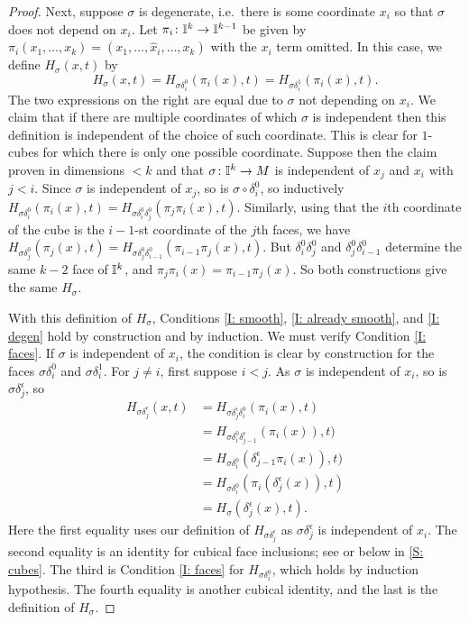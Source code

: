 \begin{proof}
	Next, suppose $\sigma$ is degenerate, i.e.\ there is some coordinate $x_i$ so that $\sigma$ does not depend on $x_i$.
	Let $\pi_i \colon \mathbb{I}^k\to\mathbb{I}^{k-1}$ be given by $\pi_i(x_1,\ldots, x_k) = (x_1,\ldots, \hat x_i, \ldots, x_k)$ with the $x_i$ term omitted.
	In this case, we define $H_\sigma(x,t)$ by
	\[H_\sigma(x,t) = H_{\sigma \delta_i^0}(\pi_i(x),t) = H_{\sigma \delta_i^1}(\pi_i(x),t).\]
	The two expressions on the right are equal due to $\sigma$ not depending on $x_i$.
	We claim that if there are multiple coordinates of which $\sigma$ is independent then this definition is independent of the choice of such coordinate.
	This is clear for $1$-cubes for which there is only one possible coordinate.
	Suppose then the claim proven in dimensions $<k$ and that $\sigma \colon \mathbb{I}^k \to M$ is independent of $x_j$ and $x_i$ with $j<i$.
	Since $\sigma$ is independent of $x_j$, so is $\sigma \circ \delta_i^0$, so inductively $H_{\sigma \delta_i^0}(\pi_i(x),t) = H_{\sigma \delta_i^0\delta_j^0}(\pi_j\pi_i(x),t)$.
	Similarly, using that the $i$th coordinate of the cube is the $i-1$-st coordinate of the $j$th faces, we have $H_{\sigma \delta_j^0}(\pi_j(x),t) = H_{\sigma \delta_j^0\delta_{i-1}^0}(\pi_{i-1}\pi_j(x),t)$.
	But $\delta_i^0\delta_j^0$ and $\delta_j^0\delta_{i-1}^0$ determine the same $k-2$ face of $\mathbb{I}^k$, and $\pi_j\pi_i(x) = \pi_{i-1}\pi_j(x)$.
	So both constructions give the same $H_\sigma$.

	With this definition of $H_\sigma$, Conditions \eqref{I: smooth}, \eqref{I: already smooth}, and \eqref{I: degen} hold by construction and by induction.
	We must verify Condition \eqref{I: faces}.
	If $\sigma$ is independent of $x_i$, the condition is clear by construction for the faces $\sigma\delta_i^0$ and $\sigma\delta_i^1$.
	For $j\neq i$, first suppose $i<j$.
	As $\sigma$ is independent of $x_i$, so is $\sigma\delta_j^\epsilon$, so
	\begin{align*}
		H_{\sigma\delta_j^\epsilon}(x,t)& = H_{\sigma\delta_j^\epsilon \delta_i^0}(\pi_i(x),t)\\
		& = H_{\sigma \delta_i^0\delta_{j-1}^\epsilon}(\pi_i(x)),t)\\
		& = H_{\sigma \delta_i^0}(\delta_{j-1}^\epsilon\pi_i(x)),t)\\
		& = H_{\sigma \delta_i^0}(\pi_i(\delta_j^\epsilon(x)),t)\\
		& = H_\sigma(\delta_j^\epsilon(x),t).
	\end{align*}
	Here the first equality uses our definition of $H_{\sigma\delta_j^\epsilon}$ as $\sigma\delta_j^\epsilon$ is independent of $x_i$.
	The second equality is an identity for cubical face inclusions; see \cite[Section 4]{GrMa03} or below in \cref{S: cubes}.
	The third is Condition \eqref{I: faces} for $H_{\sigma \delta_i^0}$, which holds by induction hypothesis.
	The fourth equality is another cubical identity, and the last is the definition of $H_\sigma$.


\end{proof}
